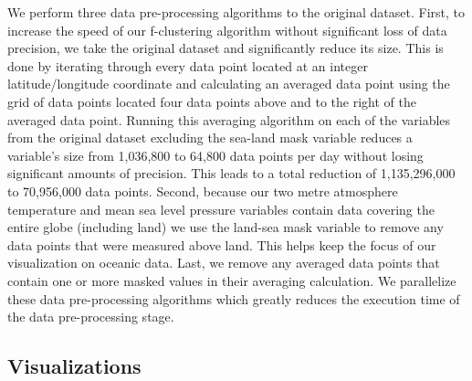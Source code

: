 \documentclass[conference,compsoc]{IEEEtran}
\begin{document}
We perform three data pre-processing algorithms to the original dataset. First, to increase the speed of our f-clustering algorithm without significant loss of data precision, we take the original dataset and significantly reduce its size. This is done by iterating through every data point located at an integer latitude/longitude coordinate and calculating an averaged data point using the grid of data points located four data points above and to the right of the averaged data point. Running this averaging algorithm on each of the variables from the original dataset excluding the sea-land mask variable reduces a variable's size from 1,036,800 to 64,800 data points per day without losing significant amounts of precision. This leads to a total reduction of 1,135,296,000 to 70,956,000 data points. Second, because our two metre atmosphere temperature and mean sea level pressure variables contain data covering the entire globe (including land) we use the land-sea mask variable to remove any data points that were measured above land. This helps keep the focus of our visualization on oceanic data. Last, we remove any averaged data points that contain one or more masked values in their averaging calculation. We parallelize these data pre-processing algorithms which greatly reduces the execution time of the data pre-processing stage.

\subsection{Visualizations}
\end{document}

